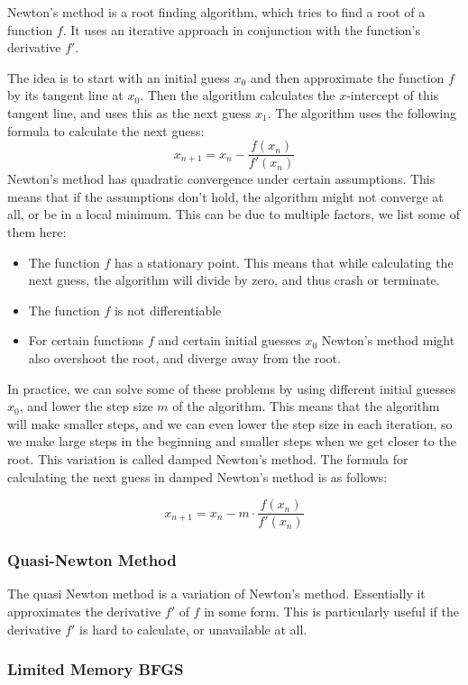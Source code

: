 Newton's method is a root finding algorithm, which tries to find a root of a function $f$. It uses an iterative approach in conjunction with the function's derivative $f'$. 

The idea is to start with an initial guess $x_0$ and then approximate the function $f$ by its tangent line at $x_0$. Then the algorithm calculates the $x$-intercept of this tangent line, and uses this as the next guess $x_1$. 
The algorithm uses the following formula to calculate the next guess:
\[
    x_{n+1} = x_n - \frac{f(x_n)}{f'(x_n)}  
\]
Newton's method has quadratic convergence under certain assumptions. This means that if the assumptions don't hold, the algorithm might not converge at all, or be in a local minimum. This can be due to multiple factors, we 
list some of them here:

\begin{itemize}
    \item The function $f$ has a stationary point. This means that while calculating the next guess, the algorithm will divide by zero, and thus crash or terminate.
    \item The function $f$ is not differentiable
    \item For certain functions $f$ and certain initial guesses $x_0$ Newton's method might also overshoot the root, and diverge away from the root.
\end{itemize}

In practice, we can solve some of these problems by using different initial guesses $x_0$, and lower the step size $m$ of the algorithm. This means that the algorithm will make smaller steps, and we can even lower the step size 
in each iteration, so we make large steps in the beginning and smaller steps when we get closer to the root. This variation is called damped Newton's method. The formula for calculating the next guess in damped Newton's method is as follows:

\[
    x_{n+1} = x_n - m \cdot \frac{f(x_n)}{f'(x_n)}
\]

\subsubsection{Quasi-Newton Method}

The quasi Newton method is a variation of Newton's method. Essentially it approximates the derivative $f'$ of $f$ in some form. This is particularly useful if the derivative $f'$ is hard to calculate, or unavailable at all.

\subsubsection{Limited Memory BFGS}\label{sec:lbfgsb}

